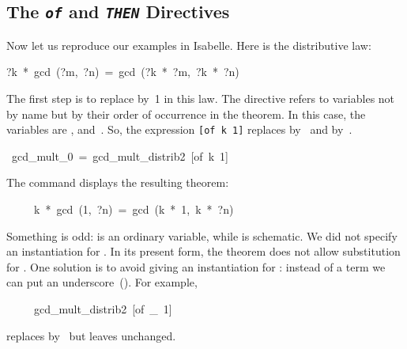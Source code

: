 \subsection{The {\tt\slshape of} and {\tt\slshape THEN} Directives}

Now let us reproduce our examples in Isabelle.  Here is the distributive
law:
\begin{isabelle}
?k\ *\ gcd\ (?m,\ ?n)\ =\ gcd\ (?k\ *\ ?m,\ ?k\ *\ ?n)
\end{isabelle}%
The first step is to replace  by~1 in this law.  
The 
directive
refers to variables not by name but by their order of occurrence in the theorem. 
In this case, the variables  are ,  and~. So, the
expression
\hbox{\texttt{[of k 1]}} replaces  by~ and 
by~.
\begin{isabelle}
\ gcd_mult_0\ =\ gcd_mult_distrib2\ [of\ k\ 1]
\end{isabelle}
%
The command 
displays the resulting theorem:
\begin{isabelle}
\ \ \ \ \ k\ *\ gcd\ (1,\ ?n)\ =\ gcd\ (k\ *\ 1,\ k\ *\ ?n)
\end{isabelle}
Something is odd: {} is an ordinary variable, while {} 
is schematic.  We did not specify an instantiation 
for {}.  In its present form, the theorem does not allow 
substitution for {}.  One solution is to avoid giving an instantiation for
: instead of a term we can put an underscore~(\isa{_}).  For example,
\begin{isabelle}
\ \ \ \ \ gcd_mult_distrib2\ [of\ _\ 1]
\end{isabelle}
replaces  by~ but leaves  unchanged.  


